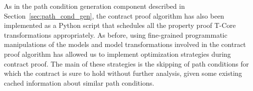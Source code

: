 As in the path condition generation component described in
Section~\ref{sec:path_cond_gen}, the contract proof algorithm has also been
implemented as a Python script that schedules all the property proof T-Core
transformations appropriately. As before, using fine-grained programmatic
manipulations of the models and model transformations involved in the contract
proof algorithm has allowed us to implement optimization strategies during
contract proof. The main of these strategies is the skipping of path conditions
for which the contract is sure to hold without further analysis, given some
existing cached information about similar path conditions.


